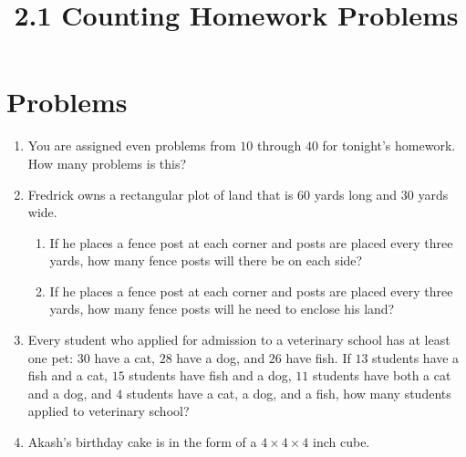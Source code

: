 \documentclass{article}
\title{2.1 Counting Homework Problems}
\author{}
\date{}
\begin{document}
\maketitle
\section*{Problems}

\begin{enumerate}
	\item You are assigned even problems from $10$ through $40$ for tonight's 
		homework. How many problems is this?
		\vspace{3cm}
    \item Fredrick owns a rectangular plot of land that is $60$ yards long and 
    $30$ yards wide.
    \begin{enumerate}
        \item If he places a fence post at each corner and posts are placed 
            every three yards, how many fence posts will there be on each 
            side?
            \vspace{3cm}
        \item If he places a fence post at each corner and posts are placed 
            every three yards, how many fence posts will he need to enclose 
            his land?
            \vspace{3cm}
    \end{enumerate}
    \item Every student who applied for admission to a veterinary school has 
    at least one pet: $30$ have a cat, $28$ have a dog, and $26$ have 
    fish. If $13$ students have a fish and a cat, $15$ students have 
    fish and a dog, $11$ students have both a cat and a dog, and $4$ 
    students have a cat, a dog, and a fish, how many students applied to 
    veterinary school? 
    \begin{center}
    \end{center}
    \vspace{3cm}
    \item Akash's birthday cake is in the form of a $4 \times 4 \times 4$ inch cube.

\end{enumerate}
\end{document}

